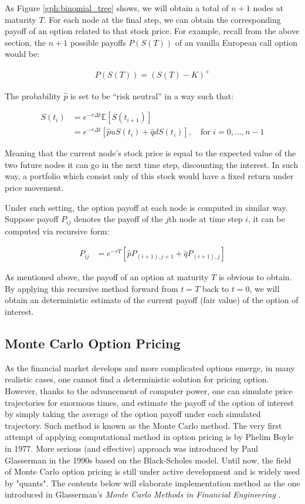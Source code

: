 As Figure \ref{gph:binomial_tree} shows, we will obtain a total of $n+1$ nodes at maturity $T$. For each node at the final step, we can obtain the corresponding payoff of an option related to that stock price. For example, recall from the above section, the $n+1$ possible payoffs $P(S(T))$ of an vanilla European call option would be:

\begin{align}
P(S(T))=(S(T)-K)^+
\end{align}

The probability $\hat{p}$ is set to be ``risk neutral'' in a way such that:

\begin{align}
S(t_{i}) &= e^{-r\Delta t}\mathbb{E}[S(t_{i+1})] \\
		 &= e^{-r\Delta t}[\hat{p}uS(t_i)+\hat{q}dS(t_i)],\quad\text{for }i=0,...,n-1
\end{align}

Meaning that the current node's stock price is equal to the expected value of the two future nodes it can go in the next time step, discounting the interest. In such way, a portfolio which consist only of this stock would have a fixed return under price movement.

Under such setting, the option payoff at each node is computed in similar way. Suppose payoff $P_{ij}$ denotes the payoff of the $j$th node at time step $i$, it can be computed via recursive form:

\begin{align}
P_{ij} &= e^{-rT}[\hat{p}P_{(i+1),j+1} + \hat{q}P_{(i+1),j}]
\end{align}

As mentioned above, the payoff of an option at maturity $T$ is obvious to obtain. By applying this recursive method forward from $t=T$ back to $t=0$, we will obtain an deterministic estimate of the current payoff (fair value) of the option of interest.

\subsection{Monte Carlo Option Pricing}

As the financial market develops and more complicated options emerge, in many realistic cases, one cannot find a deterministic solution for pricing option. However, thanks to the advancement of computer power, one can simulate price trajectories for enormous times, and estimate the payoff of the option of interest by simply taking the average of the option payoff under each simulated trajectory. Such method is known as the Monte Carlo method. The very first attempt of applying computational method in option pricing is by Phelim Boyle in 1977. More serious (and effective) approach was introduced by Paul Glasserman in the 1990s based on the Black-Scholes model. Until now, the field of Monte Carlo option pricing is still under active development and is widely used by "quants". The contents below will elaborate implementation method as the one introduced in Glasserman's \textit{Monte Carlo Methods in Financial Engineering} \cite{Glasserman2003}.

